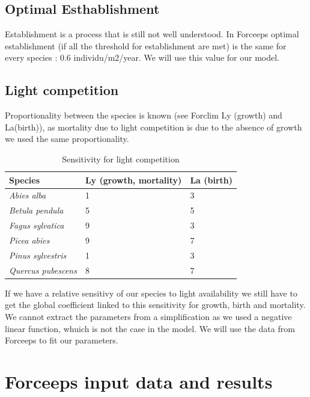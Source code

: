 \documentclass{article}
\begin{document}
\subsection{Optimal Esthablishment}

Establishment is a process that is still not well understood. In Forceeps optimal establishment (if all the threshold for establishment are met) is the same for every species : 0.6 individu/m2/year. We will use this value for our model.

\subsection {Light competition}

Proportionality between the species is known (see Forclim Ly (growth) and La(birth)), as mortality due to light competition is due to the absence of growth we used the same proportionality.

\begin{table}[H]
\begin{center}
    \begin{tabular}{lll}
    \hline
    Species & Ly (growth, mortality) & La (birth) \\ \hline
    \textit{Abies alba} & 1 & 3 \\
    \textit{Betula pendula} & 5 & 5 \\
    \textit{Fagus sylvatica} & 9 & 3 \\
    \textit{Picea abies} & 9 & 7 \\
    \textit{Pinus sylvestris} & 1 & 3 \\
    \textit{Quercus pubescens} & 8 & 7 \\ \hline
    \end{tabular}
    \caption{Sensitivity for light competition}
\end{center}
\end{table}

If we have a relative sensitivy of our species to light availability we still have to get the global coefficient linked to this sensitivity for growth, birth and mortality. We cannot extract the parameters from a simplification as we used a negative linear function, whuich is not the case in the model. We will use the data from Forceeps to fit our parameters.

\section{Forceeps input data and results}
\end{document}
